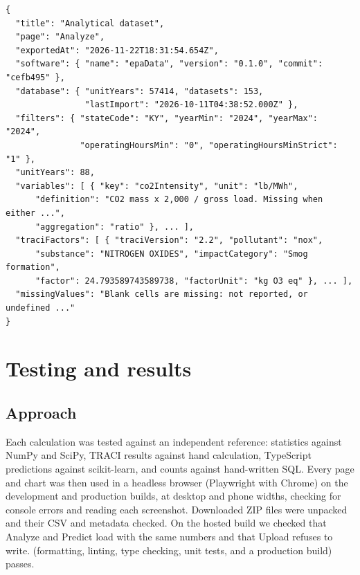 \documentclass[11pt,a4paper]{article}
\begin{document}
\par\noindent\begin{minipage}{\linewidth}
\begin{lstlisting}[language={}, caption={\code{metadata.json} of an analytical-dataset export (shortened).}, label=lst:meta, numbers=none]
{
  "title": "Analytical dataset",
  "page": "Analyze",
  "exportedAt": "2026-11-22T18:31:54.654Z",
  "software": { "name": "epaData", "version": "0.1.0", "commit": "cefb495" },
  "database": { "unitYears": 57414, "datasets": 153,
                "lastImport": "2026-10-11T04:38:52.000Z" },
  "filters": { "stateCode": "KY", "yearMin": "2024", "yearMax": "2024",
               "operatingHoursMin": "0", "operatingHoursMinStrict": "1" },
  "unitYears": 88,
  "variables": [ { "key": "co2Intensity", "unit": "lb/MWh",
      "definition": "CO2 mass x 2,000 / gross load. Missing when either ...",
      "aggregation": "ratio" }, ... ],
  "traciFactors": [ { "traciVersion": "2.2", "pollutant": "nox",
      "substance": "NITROGEN OXIDES", "impactCategory": "Smog formation",
      "factor": 24.793589743589738, "factorUnit": "kg O3 eq" }, ... ],
  "missingValues": "Blank cells are missing: not reported, or undefined ..."
}
\end{lstlisting}
\end{minipage}

\section{Testing and results}
\label{sec:testing}

\subsection{Approach}

Each calculation was tested against an independent reference: statistics against NumPy and
SciPy, TRACI results against hand calculation, TypeScript predictions against scikit-learn, and
counts against hand-written SQL. Every page and chart was then used in a headless browser
(Playwright with Chrome) on the development and production builds, at desktop and phone
widths, checking for console errors and reading each screenshot. Downloaded ZIP files were
unpacked and their CSV and metadata checked. On the hosted build we checked that Analyze and
Predict load with the same numbers and that Upload refuses to write.
 (formatting, linting, type checking, unit tests, and a production build)
passes.
\end{document}
